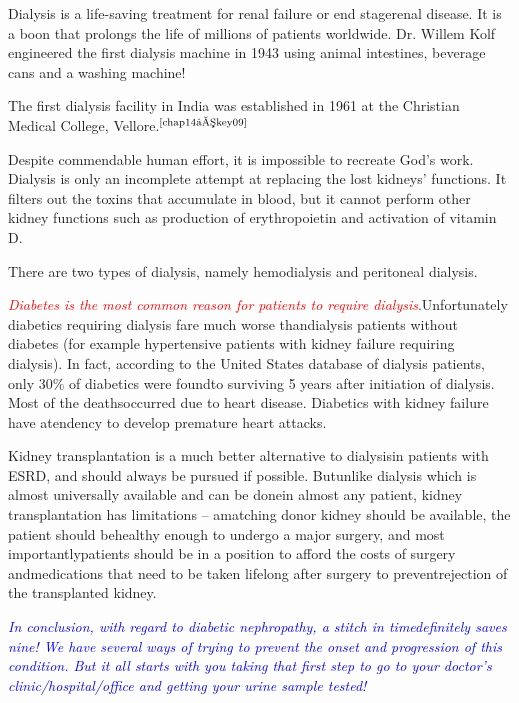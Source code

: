 
Dialysis is a life-saving treatment for renal failure or end stage\break renal disease. It is a boon that prolongs the life of millions of patients worldwide. Dr. Willem Kolf engineered the first dialysis machine in 1943 using animal intestines, beverage cans and a washing machine!

The first dialysis facility in India was established in 1961 at the Christian Medical College, Vellore.$^{\text{\cite{chap14–key09}}}$

Despite commendable human effort, it is impossible to recreate God’s work. Dialysis is only an incomplete attempt at replacing the lost kidneys’ functions. It filters out the toxins that accumulate in blood, but it cannot perform other kidney functions such as production of erythropoietin and activation of vitamin D.

There are two types of dialysis, namely hemodialysis and peritoneal dialysis.

\textcolor{red}{\textit{Diabetes is the most common reason for patients to require dialysis}}.\break Unfortunately diabetics requiring dialysis fare much worse than\break dialysis patients without diabetes (for example hypertensive patients with kidney failure requiring dialysis). In fact, according to the United States database of dialysis patients, only 30\% of diabetics were found\break to surviving 5 years after initiation of dialysis. Most of the deaths\break occurred due to heart disease. Diabetics with kidney failure have a\break tendency to develop premature heart attacks.


Kidney transplantation is a much better alternative to dialysis\break in patients with ESRD, and should always be pursued if possible. But\break unlike dialysis which is almost universally available and can be done\break in almost any patient, kidney transplantation has limitations – a\break matching donor kidney should be available, the patient should be\break healthy enough to undergo a major surgery, and most importantly\break patients should be in a position to afford the costs of surgery and\break medications that need to be taken lifelong after surgery to prevent\break rejection of the transplanted kidney.

\textcolor{blue}{\textit{In conclusion, with regard to diabetic nephropathy, a stitch in time\break definitely saves nine! We have several ways of trying to prevent the onset and progression of this condition. But it all starts with you taking that first step to go to your doctor’s clinic/hospital/office and getting your urine sample tested!}}

